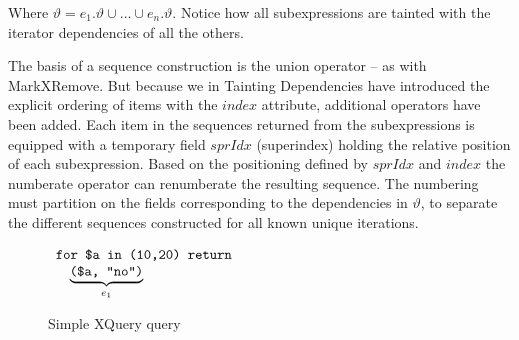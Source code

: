 Where $\vartheta=e_{1}.\vartheta \cup \ldots \cup e_{n}.\vartheta$. Notice how all subexpressions are tainted with
the iterator dependencies of all the others.

The basis of a sequence construction is the \textsf{union} operator -- as with MarkXRemove. But because we in
Tainting Dependencies have introduced the explicit ordering of items with the
$index$ attribute, additional operators have been added. Each item in the sequences returned from the subexpressions is equipped with a
temporary field $sprIdx$ (superindex) holding the relative position of each subexpression. Based on the
positioning defined by $sprIdx$ and $index$ the \textsf{numberate} operator can renumberate the resulting
sequence. The numbering must partition on the fields corresponding to the dependencies in $\vartheta$, to separate
the different sequences constructed for all known unique iterations.

\begin{figure}[h]
\centering
\begin{math}
\begin{array}{l}
\mbox{\texttt{for \$a in (10,20) return}} \\ \quad 
\underbrace{ \mbox{\texttt{(\$a, "no")}} }_{e_{1}}
\end{array}
\end{math}
\caption{Simple XQuery query}
\label{fig:trans:TD:simpQuery}
\end{figure}

